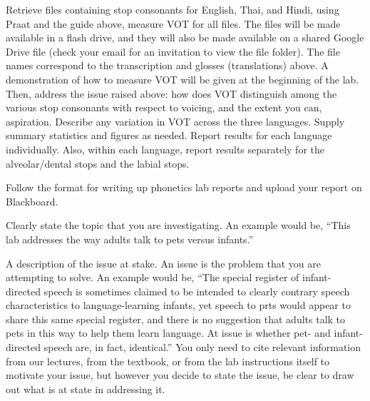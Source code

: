 \documentclass[lab={2},title={Voice Onset Time}]{com310lab}
\begin{document}
\begin{task}
	Retrieve files containing stop consonants for English, Thai, and Hindi, using Praat and the guide above, measure VOT for all files.
	The files will be made available in a flash drive, and they will also be made available on a shared Google Drive file (check your email for an invitation to view the file folder).
	The file names correspond to the transcription and glosses (translations) above.
	A demonstration of how to measure VOT will be given at the beginning of the lab.\\

	Then, address the issue raised above: how does VOT distinguish among the various stop consonants with respect to voicing, and the extent you can, aspiration.
	Describe any variation in VOT across the three languages.
	Supply summary statistics and figures as needed.
	Report results for each language individually.
	Also, within each language, report results separately for the alveolar/dental stops and the labial stops.
\end{task}

\begin{writeup}
	Follow the format for writing up phonetics lab reports and upload your report on Blackboard.
\end{writeup}

\pagebreak

\labtitle

\begin{topic}
	Clearly state the topic that you are investigating.
	An example would be, ``This lab addresses the way adults talk to pets versus infants.''
\end{topic}

\begin{issue}
	A description of the issue at stake.
	An issue is the problem that you are attempting to solve.
	An example would be,
	``The special register of infant-directed speech is sometimes claimed to be intended to clearly contrary speech characteristics to language-learning infants, yet speech to prts would appear to share this same special register, and there is no suggestion that adults talk to pets in this way to help them learn language.
	At issue is whether pet- and infant-directed speech are, in fact, identical.''
	You only need to cite relevant information from our lectures, from the textbook, or from the lab instructions itself to motivate your issue, but however you decide to state the issue, be clear to draw out what is at state in addressing it.
\end{issue}
\end{document}
